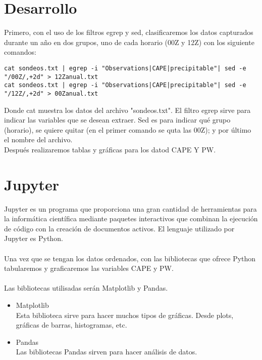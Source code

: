 \documentclass[a4paper]{article}
\begin{document}
\section*{Desarrollo}
Primero, con el uso de los filtros egrep y sed, clasificaremos los datos capturados durante un año en dos grupos, uno de cada horario (00Z y 12Z) con los siguiente comandos: \begin{verbatim}
cat sondeos.txt | egrep -i "Observations|CAPE|precipitable"| sed -e "/00Z/,+2d" > 12Zanual.txt
cat sondeos.txt | egrep -i "Observations|CAPE|precipitable"| sed -e "/12Z/,+2d" > 00Zanual.txt

\end{verbatim}  
Donde cat muestra los datos del archivo "sondeos.txt". El filtro egrep sirve para indicar las variables que se desean extraer. Sed es para indicar qué grupo (horario), se quiere quitar (en el primer comando se quta las 00Z); y por último el nombre del archivo.\\

Después realizaremos tablas y gráficas para los datod CAPE Y PW.
\section*{Jupyter}
Jupyter es un programa que proporciona una gran cantidad de herramientas para la informática científica mediante paquetes interactivos que combinan la ejecución de código con la creación de documentos activos. El lenguaje utilizado por Jupyter es Python. \\ \\
Una vez que se tengan los datos ordenados, con las bibliotecas que ofrece Python tabularemos y graficaremos las variables CAPE y PW. \\ \\ 
Las bibliotecas utilisadas serán Matplotlib y Pandas. 
\begin{itemize}
\item Matplotlib\\
Esta biblioteca sirve para hacer muchos tipos de gráficas. Desde plots, gráficas de barras, histogramas, etc. 
\item Pandas\\
Las bibliotecas Pandas sirven para hacer análisis de datos. \\

\end{itemize}
\newpage
\end{document}
